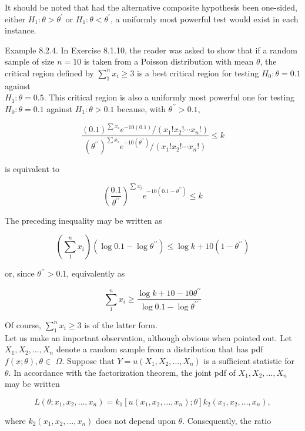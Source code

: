 It should be noted that had the alternative composite hypothesis been one-sided, either $H_{1}: \theta>\theta^{\prime}$ or $H_{1}: \theta<\theta^{\prime}$, a uniformly most powerful test would exist in each instance.

Example 8.2.4. In Exercise 8.1.10, the reader was asked to show that if a random sample of size $n=10$ is taken from a Poisson distribution with mean $\theta$, the critical region defined by $\sum_{1}^{n} x_{i} \geq 3$ is a best critical region for testing $H_{0}: \theta=0.1$ against\\
$H_{1}: \theta=0.5$. This critical region is also a uniformly most powerful one for testing $H_{0}: \theta=0.1$ against $H_{1}: \theta>0.1$ because, with $\theta^{\prime \prime}>0.1$,

$$
\frac{(0.1)^{\sum x_{i}} e^{-10(0.1)} /\left(x_{1}!x_{2}!\cdots x_{n}!\right)}{\left(\theta^{\prime \prime}\right)^{\sum x_{i}} e^{-10\left(\theta^{\prime \prime}\right)} /\left(x_{1}!x_{2}!\cdots x_{n}!\right)} \leq k
$$

is equivalent to

$$
\left(\frac{0.1}{\theta^{\prime \prime}}\right)^{\sum x_{i}} e^{-10\left(0.1-\theta^{\prime \prime}\right)} \leq k
$$

The preceding inequality may be written as

$$
\left(\sum_{1}^{n} x_{i}\right)\left(\log 0.1-\log \theta^{\prime \prime}\right) \leq \log k+10\left(1-\theta^{\prime \prime}\right)
$$

or, since $\theta^{\prime \prime}>0.1$, equivalently as

$$
\sum_{1}^{n} x_{i} \geq \frac{\log k+10-10 \theta^{\prime \prime}}{\log 0.1-\log \theta^{\prime \prime}}
$$

Of course, $\sum_{1}^{n} x_{i} \geq 3$ is of the latter form.\\
Let us make an important observation, although obvious when pointed out. Let $X_{1}, X_{2}, \ldots, X_{n}$ denote a random sample from a distribution that has pdf $f(x ; \theta), \theta \in$ $\Omega$. Suppose that $Y=u\left(X_{1}, X_{2}, \ldots, X_{n}\right)$ is a sufficient statistic for $\theta$. In accordance with the factorization theorem, the joint pdf of $X_{1}, X_{2}, \ldots, X_{n}$ may be written

$$
L\left(\theta ; x_{1}, x_{2}, \ldots, x_{n}\right)=k_{1}\left[u\left(x_{1}, x_{2}, \ldots, x_{n}\right) ; \theta\right] k_{2}\left(x_{1}, x_{2}, \ldots, x_{n}\right),
$$

where $k_{2}\left(x_{1}, x_{2}, \ldots, x_{n}\right)$ does not depend upon $\theta$. Consequently, the ratio

